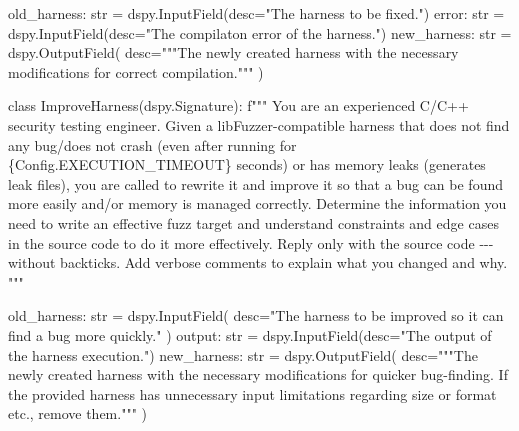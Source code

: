 \documentclass[
  a4paper,
  DIV=11,
  numbers=noendperiod]{scrreprt}
\newenvironment{Shaded}{\begin{snugshade}}{\end{snugshade}}
\newcommand{\BuiltInTok}[1]{\textcolor[rgb]{0.33,0.33,0.33}{#1}}
\newcommand{\KeywordTok}[1]{\textcolor[rgb]{0.85,0.12,0.09}{#1}}
\newcommand{\NormalTok}[1]{\textcolor[rgb]{0.33,0.33,0.33}{#1}}
\newcommand{\OperatorTok}[1]{\textcolor[rgb]{0.00,0.46,0.62}{#1}}
\newcommand{\SpecialCharTok}[1]{\textcolor[rgb]{0.00,0.46,0.62}{#1}}
\newcommand{\SpecialStringTok}[1]{\textcolor[rgb]{0.00,0.50,0.00}{#1}}
\newcommand{\StringTok}[1]{\textcolor[rgb]{0.00,0.50,0.00}{#1}}
\theoremstyle{definition}
\theoremstyle{remark}
\begin{document}
\begin{Shaded}
\begin{Highlighting}[numbers=left,,]
\NormalTok{    old\_harness: }\BuiltInTok{str} \OperatorTok{=}\NormalTok{ dspy.InputField(desc}\OperatorTok{=}\StringTok{"The harness to be fixed."}\NormalTok{)}
\NormalTok{    error: }\BuiltInTok{str} \OperatorTok{=}\NormalTok{ dspy.InputField(desc}\OperatorTok{=}\StringTok{"The compilaton error of the harness."}\NormalTok{)}
\NormalTok{    new\_harness: }\BuiltInTok{str} \OperatorTok{=}\NormalTok{ dspy.OutputField(}
\NormalTok{        desc}\OperatorTok{=}\StringTok{"""The newly created harness with the necessary modifications for}
\StringTok{        correct compilation."""}
\NormalTok{    )}


\KeywordTok{class}\NormalTok{ ImproveHarness(dspy.Signature):}
    \SpecialStringTok{f"""}
\SpecialStringTok{    You are an experienced C/C++ security testing engineer. Given a}
\SpecialStringTok{    libFuzzer{-}compatible harness that does not find any bug/does not crash (even}
\SpecialStringTok{    after running for }\SpecialCharTok{\{}\NormalTok{Config}\SpecialCharTok{.}\NormalTok{EXECUTION\_TIMEOUT}\SpecialCharTok{\}}\SpecialStringTok{ seconds) or has memory leaks}
\SpecialStringTok{    (generates leak files), you are called to rewrite it and improve it so that}
\SpecialStringTok{    a bug can be found more easily and/or memory is managed correctly. Determine}
\SpecialStringTok{    the information you need to write an effective fuzz target and understand}
\SpecialStringTok{    constraints and edge cases in the source code to do it more}
\SpecialStringTok{    effectively. Reply only with the source code {-}{-}{-} without backticks.  Add}
\SpecialStringTok{    verbose comments to explain what you changed and why.}
\SpecialStringTok{    """}

\NormalTok{    old\_harness: }\BuiltInTok{str} \OperatorTok{=}\NormalTok{ dspy.InputField(}
\NormalTok{        desc}\OperatorTok{=}\StringTok{"The harness to be improved so it can find a bug more quickly."}
\NormalTok{    )}
\NormalTok{    output: }\BuiltInTok{str} \OperatorTok{=}\NormalTok{ dspy.InputField(desc}\OperatorTok{=}\StringTok{"The output of the harness\textquotesingle{} execution."}\NormalTok{)}
\NormalTok{    new\_harness: }\BuiltInTok{str} \OperatorTok{=}\NormalTok{ dspy.OutputField(}
\NormalTok{        desc}\OperatorTok{=}\StringTok{"""The newly created harness with the necessary modifications for}
\StringTok{        quicker bug{-}finding. If the provided harness has unnecessary input}
\StringTok{        limitations regarding size or format etc., remove them."""}
\NormalTok{    )}
\end{Highlighting}
\end{Shaded}
\end{document}
